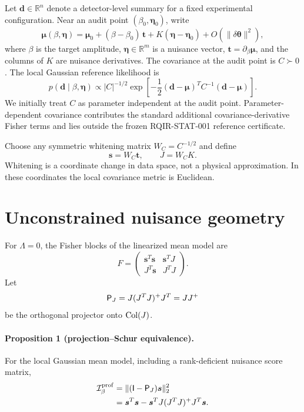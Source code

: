 Let $\bm d\in\mathbb R^n$ denote a detector-level summary for a fixed experimental configuration. Near an audit point $(\beta_0,\bm\eta_0)$, write
\begin{equation}
 \bm\mu(\beta,\bm\eta)
 =\bm\mu_0
 +(\beta-\beta_0)\,\bm t
 +K(\bm\eta-\bm\eta_0)
 +O(\|\delta\bm\theta\|^2),
\label{eq:localmean}
\end{equation}
where $\beta$ is the target amplitude, $\bm\eta\in\mathbb R^m$ is a nuisance vector, $\bm t=\partial_\beta\bm\mu$, and the columns of $K$ are nuisance derivatives. The covariance at the audit point is $C\succ0$. The local Gaussian reference likelihood is
\begin{equation}
 p(\bm d\mid\beta,\bm\eta)
 \propto |C|^{-1/2}
 \exp\!\left[-\frac12(\bm d-\bm\mu)^T C^{-1}(\bm d-\bm\mu)\right].
\label{eq:gaussian}
\end{equation}
We initially treat $C$ as parameter independent at the audit point. Parameter-dependent covariance contributes the standard additional covariance-derivative Fisher terms and lies outside the frozen RQIR-STAT-001 reference certificate.

Choose any symmetric whitening matrix $W_C=C^{-1/2}$ and define
\begin{equation}
 \bm s=W_C\bm t,\qquad J=W_C K.
\label{eq:whiten}
\end{equation}
Whitening is a coordinate change in data space, not a physical approximation. In these coordinates the local covariance metric is Euclidean.

\section{Unconstrained nuisance geometry}
\label{sec:geometry}

For $\Lambda=0$, the Fisher blocks of the linearized mean model are
\begin{equation}
F=\begin{pmatrix}
\bm s^T\bm s & \bm s^T J\\
J^T\bm s & J^T J
\end{pmatrix}.
\label{eq:fisherblock}
\end{equation}
Let
\begin{equation}
 \mathsf P_J=J(J^T J)^+J^T=J J^+
\label{eq:projector}
\end{equation}
be the orthogonal projector onto $\operatorname{Col}(J)$.

\paragraph*{Proposition 1 (projection--Schur equivalence).}
For the local Gaussian mean model, including a rank-deficient nuisance score matrix,
\begin{align}
 \mathcal I_{\beta}^{\rm prof}
 &=\| (\mathsf I-\mathsf P_J)\bm s\|_2^2
\label{eq:projfisher}\\
 &=\bm s^T\bm s-\bm s^T J(J^T J)^+J^T\bm s.
\label{eq:schur}
\end{align}

